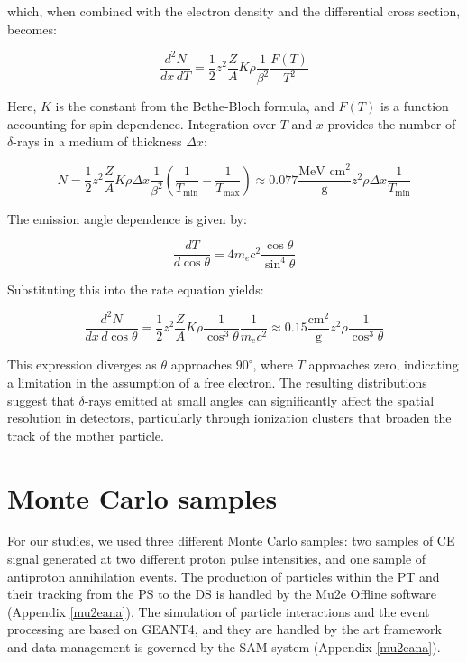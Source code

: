 which, when combined with the electron density and the differential cross section, becomes:

\begin{equation}
\frac{d^2 N}{dx \, dT} = \frac{1}{2} z^2 \frac{Z}{A} K \rho \frac{1}{\beta^2} \frac{F(T)}{T^2}
\end{equation}

Here, $K$ is the constant from the Bethe-Bloch formula, 
and $F(T)$ is a function accounting for spin dependence. 
Integration over $T$ and $x$ provides the number of $\delta$-rays in a medium of thickness $\Delta x$:

\begin{equation}
N = \frac{1}{2} z^2 \frac{Z}{A} K \rho \Delta x \frac{1}{\beta^2} \left(\frac{1}{T_{\text{min}}} - \frac{1}{T_{\text{max}}}\right) \approx 0.077 \frac{\text{MeV cm}^2}{\text{g}} z^2 \rho \Delta x \frac{1}{T_{\text{min}}}
\end{equation}

The emission angle dependence is given by:

\begin{equation}
\frac{dT}{d \cos \theta} = 4 m_e c^2 \frac{\cos \theta}{\sin^4 \theta}
\end{equation}

Substituting this into the rate equation yields:

\begin{equation}
\frac{d^2 N}{dx \, d \cos \theta} = \frac{1}{2} z^2 \frac{Z}{A} K \rho \frac{1}{\cos^3 \theta} \frac{1}{m_e c^2} \approx 0.15 \frac{\text{cm}^2}{\text{g}} z^2 \rho \frac{1}{\cos^3 \theta}
\end{equation}

This expression diverges as $\theta$ approaches $90^\circ$, 
where $T$ approaches zero, indicating a limitation in the 
assumption of a free electron. The resulting distributions 
suggest that $\delta$-rays emitted at small angles can 
significantly affect the spatial resolution in detectors, 
particularly through ionization clusters that broaden the 
track of the mother particle.



\section{Monte Carlo samples}\label{datasample}
For our studies, we used three different  
Monte Carlo samples: two samples of 
CE signal generated at two different 
proton pulse intensities, and one sample of 
antiproton annihilation events. 
The production of particles within 
the PT and their tracking from the PS to the 
DS is handled by the Mu2e Offline software 
(Appendix \ref{mu2eana}). The simulation of 
particle interactions and the event processing are based on 
GEANT4, and they are handled 
by the art framework and data management is governed by the SAM system (Appendix \ref{mu2eana}).

